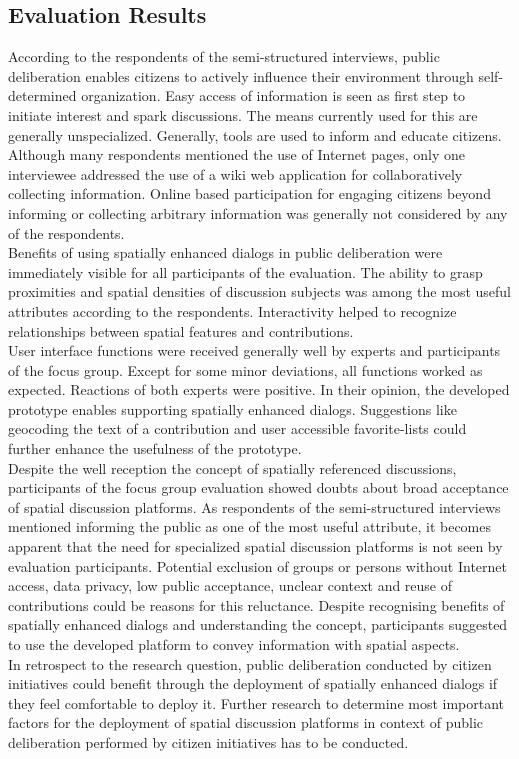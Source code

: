 \subsection{Evaluation Results}
\label{sub:evaluation-results}
According to the respondents of the semi-structured interviews, public deliberation enables citizens to actively influence their environment through self-determined organization. Easy access of information is seen as first step to initiate interest and spark discussions. The means currently used for this are generally unspecialized. Generally, tools are used to inform and educate citizens. Although many respondents mentioned the use of Internet pages, only one interviewee addressed the use of a wiki web application for collaboratively collecting information. Online based participation for engaging citizens beyond informing or collecting arbitrary information was generally not considered by any of the respondents.\\
Benefits of using spatially enhanced dialogs in public deliberation were immediately visible for all participants of the evaluation. The ability to grasp proximities and spatial densities of discussion subjects was among the most useful attributes according to the respondents. Interactivity helped to recognize relationships between spatial features and contributions.\\
User interface functions were received generally well by experts and participants of the focus group. Except for some minor deviations, all functions worked as expected. Reactions of both experts were positive. In their opinion, the developed prototype enables supporting spatially enhanced dialogs. Suggestions like geocoding the text of a contribution and user accessible favorite-lists could further enhance the usefulness of the prototype.\\%
Despite the well reception the concept of spatially referenced discussions, participants of the focus group evaluation showed doubts about broad acceptance of spatial discussion platforms. As respondents of the semi-structured interviews mentioned informing the public as one of the most useful attribute, it becomes apparent that the need for specialized spatial discussion platforms is not seen by evaluation participants. Potential exclusion of groups or persons without Internet access, data privacy, low public acceptance, unclear context and reuse of contributions could be reasons for this reluctance. Despite recognising benefits of spatially enhanced dialogs and understanding the concept, participants suggested to use the developed platform to convey information with spatial aspects.\\
In retrospect to the research question, public deliberation conducted by citizen initiatives could benefit through the deployment of spatially enhanced dialogs if they feel comfortable to deploy it. Further research to determine most important factors for the deployment of spatial discussion platforms in context of public deliberation performed by citizen initiatives has to be conducted.

